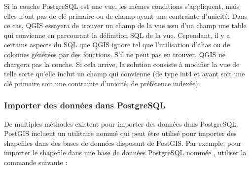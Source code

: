 Si la couche PostgreSQL est une vue, les mêmes conditions s'appliquent, mais elles n'ont pas de clé primaire ou de champ ayant une contrainte d'unicité. Dans ce cas, QGIS essayera de trouver un champ de la vue issu d'un champ une table qui convienne en parcourant la définition SQL de la vue. Cependant, il y a certains aspects du SQL que QGIS ignore tel que l'utilisation d'alias ou de colonnes générées par des fonctions. S'il ne peut pas en trouver, QGIS ne chargera pas la couche. Si cela arrive, la solution consiste à modifier la vue de telle sorte qu'elle inclut un champ qui convienne (de type int4 et ayant soit une clé primaire soit une contrainte d'unicité, de préférence indexée).

\subsubsection{Importer des données dans PostgreSQL}\label{sec:loading_postgis_data}

De multiples méthodes existent pour importer des données dans PostgreSQL. PostGIS incluent un utilitaire nommé  qui peut être utilisé pour importer des shapefiles dans des bases de données disposant de PostGIS. Par exemple, pour importer le shapefile  dans une base de données PostgreSQL nommée , utiliser la commande suivante :

